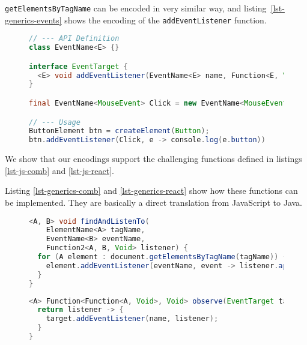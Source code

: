 \documentclass{llncs}
\newcommand{\jscode}[1]{\lstinline[language=JavaScript]|#1|}
\newcommand{\scalacode}[1]{\lstinline[language=Scala]|#1|}
\begin{document}
\scalacode{getElementsByTagName} can be encoded in very similar way, and listing~\ref{lst-generics-events} shows the encoding of the \jscode{addEventListener} function.

\begin{figure}
\begin{lstlisting}[label=lst-generics-events,language=java,caption={Encoding of the \jscode{addEventListener} function using type parameters}]
// --- API Definition
class EventName<E> {}

interface EventTarget {
  <E> void addEventListener(EventName<E> name, Function<E, Void> callback);
}

final EventName<MouseEvent> Click = new EventName<MouseEvent>();

// --- Usage
ButtonElement btn = createElement(Button);
btn.addEventListener(Click, e -> console.log(e.button))
\end{lstlisting}
\end{figure}

We show that our encodings support the challenging functions defined in listings \ref{lst-js-comb} and \ref{lst-js-react}.

Listing \ref{lst-generics-comb} and \ref{lst-generics-react} show how these functions can be implemented. They are basically a direct translation from JavaScript to Java.

\begin{figure}
\begin{lstlisting}[label=lst-generics-comb,language=java,caption={Combination of \scalacode{getElementsByTagName} and \scalacode{addEventListener} functions encoded using type parameters}]
<A, B> void findAndListenTo(
    ElementName<A> tagName,
    EventName<B> eventName,
    Function2<A, B, Void> listener) {
  for (A element : document.getElementsByTagName(tagName)) {
    element.addEventListener(eventName, event -> listener.apply(event, element));
  }
}
\end{lstlisting}
\end{figure}

\begin{figure}
\begin{lstlisting}[label=lst-generics-react,language=java,caption={Partial application of \scalacode{addEventListener} encoded with type parameters}]
<A> Function<Function<A, Void>, Void> observe(EventTarget target, EventName<A> name) {
  return listener -> {
    target.addEventListener(name, listener);
  }
}
\end{lstlisting}
\end{figure}
\end{document}
